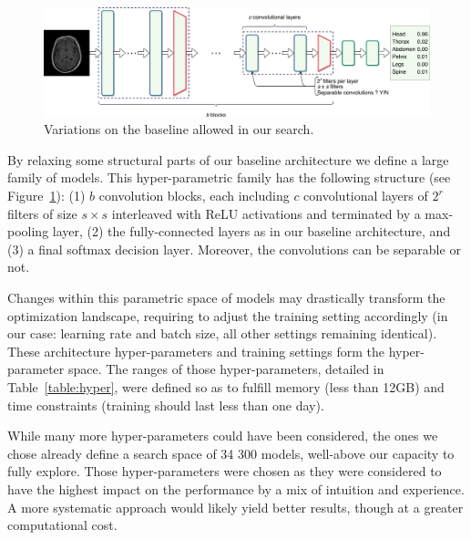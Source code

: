 \begin{figure}[htb]
	\centering
	\includegraphics[width=\linewidth]{img_hyperopt/hyperspace.pdf}
	\caption{Variations on the baseline allowed in our search.}
	\label{fig:hyperspace}
\end{figure}

By relaxing some structural parts of our baseline architecture we define a large family of models. This hyper-parametric family has the following structure (see Figure~\ref{fig:hyperspace}): (1) $b$ convolution blocks, each including $c$ convolutional layers of $2^r$ filters of size $s \times s$ interleaved with ReLU activations and terminated by a max-pooling layer, (2) the fully-connected layers as in our baseline architecture, and (3) a final softmax decision layer. Moreover, the convolutions can be separable or not.

Changes within this parametric space of models may drastically transform the optimization landscape, requiring to adjust the training setting accordingly (in our case: learning rate and batch size, all other settings remaining identical). 
These architecture hyper-parameters and training settings form the hyper-parameter space. The ranges of those hyper-parameters, detailed in Table~\ref{table:hyper}, were defined so as to fulfill memory (less than 12GB) and time constraints (training should last less than one day).

While many more hyper-parameters could have been considered, the ones we chose already define a search space of 34 300 models, well-above our capacity to fully explore. Those hyper-parameters were chosen as they were considered to have the highest impact on the performance by a mix of intuition and experience. A more systematic approach would likely yield better results, though at a greater computational cost.

